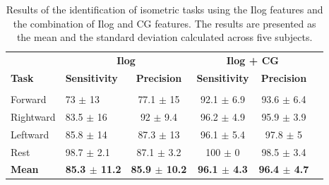 \begin{table}[]
\centering
\caption{Results of the identification of isometric tasks using the Ilog features and the combination of Ilog and CG features. The results are presented as the mean and the standard deviation calculated across five subjects.}
\label{tb:4-1}
\begin{tabular}{llcccc}
 
              & \multicolumn{2}{c}{\textbf{Ilog}}                            & \multicolumn{2}{c}{\textbf{Ilog + CG}}                       \\
\textbf{Task} & \textbf{Sensitivity}     & \textbf{Precision}       & \textbf{Sensitivity}     & \textbf{Precision}       \\ \hline
                         &                                           &          &          &                   \\
Forward       & 73 $\pm$ 13              & 77.1 $\pm$ 15            & 92.1 $\pm$ 6.9           & 93.6 $\pm$ 6.4           \\
Rightward     & 83.5 $\pm$ 16            & 92 $\pm$ 9.4             & 96.2 $\pm$ 4.9           & 95.9 $\pm$ 3.9           \\
Leftward      & 85.8 $\pm$ 14            & 87.3 $\pm$ 13            & 96.1 $\pm$ 5.4           & 97.8 $\pm$ 5             \\
Rest          & 98.7 $\pm$ 2.1           & 87.1 $\pm$ 3.2           & 100 $\pm$ 0              & 98.5 $\pm$ 3.4           \\ 
\textbf{Mean} & \textbf{85.3 $\pm$ 11.2} & \textbf{85.9 $\pm$ 10.2} & \textbf{96.1 $\pm$  4.3} & \textbf{96.4  $\pm$ 4.7}
\end{tabular}
\end{table}


